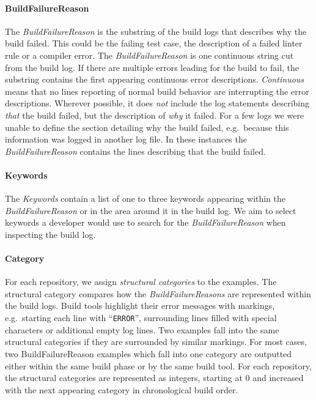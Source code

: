 \documentclass[\myrootdir/main.tex]{subfiles}
\begin{document}
\paragraph{BuildFailureReason}
The \emph{BuildFailureReason} is the substring of the build logs that describes why the build failed.
This could be the failing test case, the description of a failed linter rule or a compiler error.
The \emph{BuildFailureReason} is one continuous string cut from the build log.
If there are multiple errors leading for the build to fail, the substring contains the first appearing continuous error descriptions.
\emph{Continuous} means that no lines reporting of normal build behavior are interrupting the error descriptions.
Wherever possible, it does \emph{not} include the log statements describing \emph{that} the build failed, but the description of \emph{why} it failed.
For a few logs we were unable to define the section detailing why the build failed, e.g.\ because this information was logged in another log file.
In these instances the \emph{BuildFailureReason} contains the lines describing that the build failed.

\paragraph{Keywords}
The \emph{Keywords} contain a list of one to three keywords appearing within the \emph{BuildFailureReason} or in the area around it in the build log.
We aim to select keywords a developer would use to search for the \emph{BuildFailureReason} when inspecting the build log.

\paragraph{Category}
For each repository, we assign \emph{structural categories} to the examples.
The structural category compares how the \emph{BuildFailureReasons} are represented within the build logs.
Build tools highlight their error messages with markings, e.g.\ starting each line with ``\texttt{ERROR}'', surrounding lines filled with special characters or additional empty log lines.
Two examples fall into the same structural categories if they are surrounded by similar markings.
For most cases, two BuildFailureReason examples which fall into one category are outputted either within the same build phase or by the same build tool.
For each repository, the structural categories are represented as integers, starting at 0 and increased with the next appearing category in chronological build order.
\end{document}
